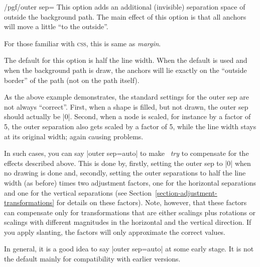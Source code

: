\begin{key}{/pgf/outer sep=}
    This option adds an additional (invisible) separation space of
     outside the background path. The main effect of this
    option is that all anchors will move a little ``to the outside''.

    For those familiar with \textsc{css}, this is same as \emph{margin}.

    The default for this option is half the line width. When the default is
    used and when the background path is draw, the anchors will lie exactly on
    the ``outside border'' of the path (not on the path itself).
\begin{codeexample}[]
\end{codeexample}

    As the above example demonstrates, the standard settings for the outer sep
    are not always ``correct''. First, when a shape is filled, but not drawn,
    the outer sep should actually be |0|. Second, when a node is scaled, for
    instance by a factor of 5, the outer separation also gets scaled by a
    factor of 5, while the line width stays at its original width; again
    causing problems.

    In such cases, you can say |outer sep=auto| to make \tikzname\ \emph{try}
    to compensate for the effects described above. This is done by, firstly,
    setting the outer sep to |0| when no drawing is done and, secondly, setting
    the outer separations to half the line width (as before) times two
    adjustment factors, one for the horizontal separations and one for the
    vertical separations (see Section~\ref{section-adjustment-transformations}
    for details on these factors). Note, however, that these factors can
    compensate only for transformations that are either scalings plus rotations
    or scalings with different magnitudes in the horizontal and the vertical
    direction. If you apply slanting, the factors will only approximate the
    correct values.

    In general, it is a good idea to say |outer sep=auto| at some early stage.
    It is not the default mainly for compatibility with earlier versions.
\begin{codeexample}[]
\end{codeexample}
\end{key}

